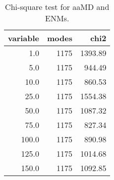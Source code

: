 \begin{table}[center]
\centering
\caption{Chi-square test for aaMD and ENMs.}
\label{tab:chi2}
\begin{tabular}{rrr}
\toprule
 variable &  modes &    chi2 \\
\midrule
      1.0 &   1175 & 1393.89 \\
      5.0 &   1175 &  944.49 \\
     10.0 &   1175 &  860.53 \\
     25.0 &   1175 & 1554.38 \\
     50.0 &   1175 & 1087.32 \\
     75.0 &   1175 &  827.34 \\
    100.0 &   1175 &  890.98 \\
    125.0 &   1175 & 1014.68 \\
    150.0 &   1175 & 1092.85 \\
\bottomrule
\end{tabular}
\end{table}
